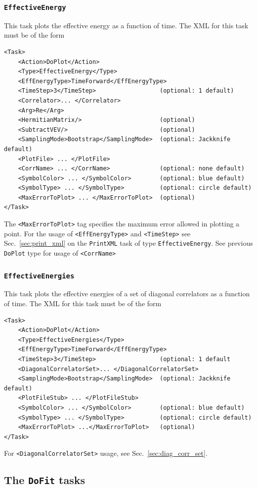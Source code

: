 \documentclass[12pt]{article}
\newcommand{\vb}{\texttt}
\begin{document}
\subsubsection{\vb{EffectiveEnergy}}
This task plots the effective energy as a function of time. The XML for 
this task must be of the form
\begin{verbatim}
<Task>
    <Action>DoPlot</Action>
    <Type>EffectiveEnergy</Type>
    <EffEnergyType>TimeForward</EffEnergyType>
    <TimeStep>3</TimeStep>                  (optional: 1 default)
    <Correlator>... </Correlator>
    <Arg>Re</Arg>
    <HermitianMatrix/>                      (optional)
    <SubtractVEV/>                          (optional)
    <SamplingMode>Bootstrap</SamplingMode>  (optional: Jackknife default)
    <PlotFile> ... </PlotFile>
    <CorrName> ... </CorrName>              (optional: none default)
    <SymbolColor> ... </SymbolColor>        (optional: blue default)
    <SymbolType> ... </SymbolType>          (optional: circle default)
    <MaxErrorToPlot> ... </MaxErrorToPlot>  (optional)
</Task>
\end{verbatim}
The \vb{<MaxErrorToPlot>} tag specifies the maximum error allowed in plotting a point.
For the usage of \vb{<EffEnergyType>} and \vb{<TimeStep>} see Sec.~\ref{sec:print_xml}
on the \vb{PrintXML} task of type \vb{EffectiveEnergy}.
See previous \vb{DoPlot} type for usage of \vb{<CorrName>}

\subsubsection{\vb{EffectiveEnergies}}
This task plots the effective energies of a set of diagonal correlators
as a function of time. The XML for this task must be of the form
\begin{verbatim}
<Task>
    <Action>DoPlot</Action>
    <Type>EffectiveEnergies</Type>
    <EffEnergyType>TimeForward</EffEnergyType>
    <TimeStep>3</TimeStep>                  (optional: 1 default
    <DiagonalCorrelatorSet>... </DiagonalCorrelatorSet>
    <SamplingMode>Bootstrap</SamplingMode>  (optional: Jackknife default)
    <PlotFileStub> ... </PlotFileStub>
    <SymbolColor> ... </SymbolColor>        (optional: blue default)
    <SymbolType> ... </SymbolType>          (optional: circle default)
    <MaxErrorToPlot> ...</MaxErrorToPlot>   (optional)
</Task>
\end{verbatim}
For \vb{<DiagonalCorrelatorSet>} usage, see Sec.~\ref{sec:diag_corr_set}.


\subsection{The \vb{DoFit} tasks}
\end{document}
